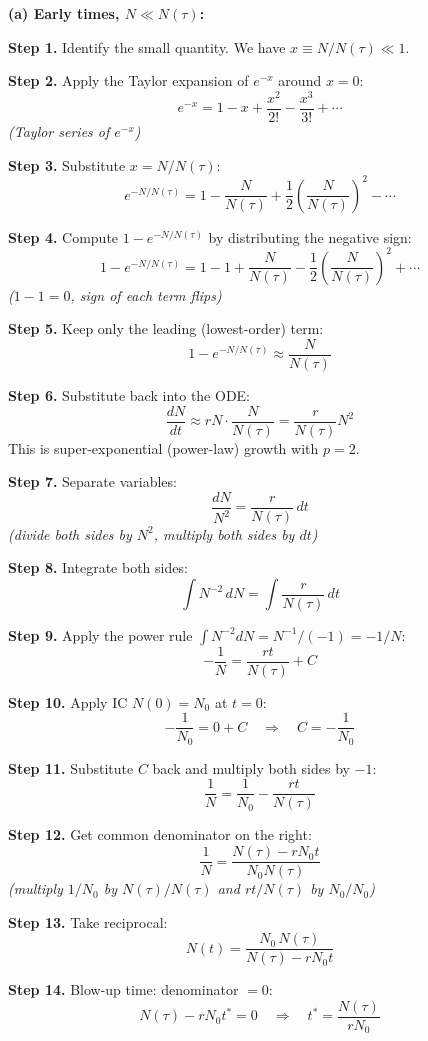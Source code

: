 \documentclass[10pt]{article}
\newcommand{\thus}{\quad\Longrightarrow\quad}
\newcommand{\stepwhy}[1]{\textcolor{blue!60!black}{\small\textit{(#1)}}}
\begin{document}
\begin{solution}
\textbf{(a) Early times, $N \ll N(\tau)$:}

\textbf{Step 1.} Identify the small quantity. We have $x \equiv N/N(\tau) \ll 1$.

\textbf{Step 2.} Apply the Taylor expansion of $e^{-x}$ around $x=0$:
\[
e^{-x} = 1 - x + \frac{x^2}{2!} - \frac{x^3}{3!} + \cdots
\]
\stepwhy{Taylor series of $e^{-x}$}

\textbf{Step 3.} Substitute $x = N/N(\tau)$:
\[
e^{-N/N(\tau)} = 1 - \frac{N}{N(\tau)} + \frac{1}{2}\left(\frac{N}{N(\tau)}\right)^2 - \cdots
\]

\textbf{Step 4.} Compute $1 - e^{-N/N(\tau)}$ by distributing the negative sign:
\[
1 - e^{-N/N(\tau)} = 1 - 1 + \frac{N}{N(\tau)} - \frac{1}{2}\left(\frac{N}{N(\tau)}\right)^2 + \cdots
\]
\stepwhy{$1 - 1 = 0$, sign of each term flips}

\textbf{Step 5.} Keep only the leading (lowest-order) term:
\[
1 - e^{-N/N(\tau)} \approx \frac{N}{N(\tau)}
\]

\textbf{Step 6.} Substitute back into the ODE:
\[
\frac{dN}{dt} \approx rN\cdot\frac{N}{N(\tau)} = \frac{r}{N(\tau)}N^2
\]
This is super-exponential (power-law) growth with $p=2$.

\textbf{Step 7.} Separate variables:
\[
\frac{dN}{N^2} = \frac{r}{N(\tau)}\,dt
\]
\stepwhy{divide both sides by $N^2$, multiply both sides by $dt$}

\textbf{Step 8.} Integrate both sides:
\[
\int N^{-2}\,dN = \int\frac{r}{N(\tau)}\,dt
\]

\textbf{Step 9.} Apply the power rule $\int N^{-2}dN = N^{-1}/(-1) = -1/N$:
\[
-\frac{1}{N} = \frac{rt}{N(\tau)} + C
\]

\textbf{Step 10.} Apply IC $N(0) = N_0$ at $t=0$:
\[
-\frac{1}{N_0} = 0 + C \thus C = -\frac{1}{N_0}
\]

\textbf{Step 11.} Substitute $C$ back and multiply both sides by $-1$:
\[
\frac{1}{N} = \frac{1}{N_0} - \frac{rt}{N(\tau)}
\]

\textbf{Step 12.} Get common denominator on the right:
\[
\frac{1}{N} = \frac{N(\tau) - rN_0 t}{N_0 N(\tau)}
\]
\stepwhy{multiply $1/N_0$ by $N(\tau)/N(\tau)$ and $rt/N(\tau)$ by $N_0/N_0$}

\textbf{Step 13.} Take reciprocal:
\[
\boxed{N(t) = \frac{N_0\,N(\tau)}{N(\tau) - rN_0 t}}
\]

\textbf{Step 14.} Blow-up time: denominator $= 0$:
\[
N(\tau) - rN_0 t^* = 0 \thus t^* = \frac{N(\tau)}{rN_0}
\]


\end{solution}
\end{document}
